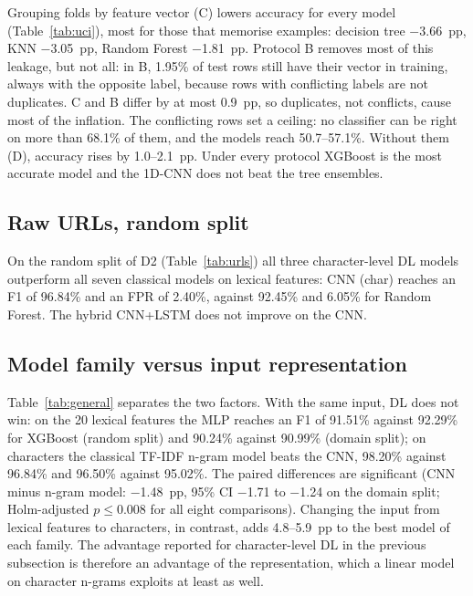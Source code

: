 \documentclass[conference]{IEEEtran}
\begin{document}
Grouping folds by feature vector (C) lowers accuracy for every model (Table~\ref{tab:uci}), most for those that memorise examples: decision tree $-$3.66~pp, KNN $-$3.05~pp, Random Forest $-$1.81~pp. Protocol B removes most of this leakage, but not all: in B, 1.95\% of test rows still have their vector in training, always with the opposite label, because rows with conflicting labels are not duplicates. C and B differ by at most 0.9~pp, so duplicates, not conflicts, cause most of the inflation. The conflicting rows set a ceiling: no classifier can be right on more than 68.1\% of them, and the models reach 50.7--57.1\%. Without them (D), accuracy rises by 1.0--2.1~pp. Under every protocol XGBoost is the most accurate model and the 1D-CNN does not beat the tree ensembles.



\subsection{Raw URLs, random split}

On the random split of D2 (Table~\ref{tab:urls}) all three character-level DL models outperform all seven classical models on lexical features: CNN (char) reaches an F1 of 96.84\% and an FPR of 2.40\%, against 92.45\% and 6.05\% for Random Forest. The hybrid CNN+LSTM does not improve on the CNN.



\subsection{Model family versus input representation}

Table~\ref{tab:general} separates the two factors. With the same input, DL does not win: on the 20 lexical features the MLP reaches an F1 of 91.51\% against 92.29\% for XGBoost (random split) and 90.24\% against 90.99\% (domain split); on characters the classical TF-IDF n-gram model beats the CNN, 98.20\% against 96.84\% and 96.50\% against 95.02\%. The paired differences are significant (CNN minus n-gram model: $-$1.48~pp, 95\% CI $-$1.71 to $-$1.24 on the domain split; Holm-adjusted $p\le0.008$ for all eight comparisons). Changing the input from lexical features to characters, in contrast, adds 4.8--5.9~pp to the best model of each family. The advantage reported for character-level DL in the previous subsection is therefore an advantage of the representation, which a linear model on character n-grams exploits at least as well.
\end{document}
